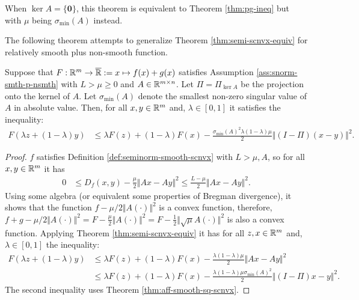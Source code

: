 \documentclass[12pt]{article}
\begin{document}
            \begin{remark}
                When $\ker A = \{\mathbf 0\}$, this theorem is equivalent to Theorem \ref{thm:pg-ineq} but with $\mu$ being $\sigma_{\min}(A)$ instead. 
            \end{remark}
            The following theorem attempts to generalize Theorem \ref{thm:semi-scnvx-equiv} for relatively smooth plus non-smooth function. 
            \begin{theorem}\label{thm:smnrm-jnsn-smth-nsmth}
                Suppose that $F:\mathbb R^m \rightarrow \overline {\mathbb R} := x \mapsto f(x) + g(x)$ satisfies Assumption \ref{ass:snorm-smth-p-nsmth} with $L > \mu \ge 0$ and $A \in \mathbb R^{m\times n}$.
                Let $\Pi = \Pi_{\ker A}$ be the projection onto the kernel of $A$. 
                Let $\sigma_{\min}(A)$ denote the smallest non-zero singular value of $A$ in absolute value. 
                Then, for all $x, y \in \mathbb R^m$ and, $\lambda \in [0, 1]$ it satisfies the inequality: 
                \begin{align*}
                    F(\lambda z + (1 - \lambda)y) &\le \lambda F(z) + (1 - \lambda)F(x) - \frac{\sigma_{\min}(A)^2\lambda(1 - \lambda)\mu}{2}\Vert (I - \Pi)(x - y)\Vert^2. 
                \end{align*}
            \end{theorem}
            \begin{proof}
                $f$ satisfies Definition \ref{def:seminorm-smooth-scnvx} with $L > \mu, A$, so for all $x, y \in \mathbb R^m$ it has 
                \begin{align*}
                    0 &\le D_f(x, y) - \frac{\mu}{2}\Vert Ax - Ay\Vert^2 
                    \le \frac{L - \mu}{2}\Vert Ax - Ay\Vert^2. 
                \end{align*}
                Using some algebra (or equivalent some properties of Bregman divergence), it shows that the function $f - \mu/2 \Vert A(\cdot)\Vert^2$ is a convex function, therefore, $f + g - \mu/2\Vert A(\cdot)\Vert^2 = F - \frac{\mu}{2}\Vert A(\cdot)\Vert^2 = F - \frac{1}{2}\Vert \sqrt{\mu}A(\cdot)\Vert^2$ is also a convex function. 
                Applying Theorem \ref{thm:semi-scnvx-equiv} it has for all $z, x \in \mathbb R^m$ and, $\lambda \in [0, 1]$ the inequality: 
                \begin{align*}
                    F(\lambda z + (1 - \lambda)y) &\le \lambda F(z) + (1 - \lambda)F(x) - \frac{\lambda(1 - \lambda)\mu}{2}\Vert Ax - Ay\Vert^2
                    \\
                    &\le 
                    \lambda F(z) + (1 - \lambda)F(x) - \frac{\lambda(1 - \lambda)\mu\sigma_{\min}(A)^2}{2}\Vert (I - \Pi) x - y\Vert^2. 
                \end{align*}
                The second inequality uses Theorem \ref{thm:aff-smooth-sq-scnvx}. 
            \end{proof}
        
\end{document}
